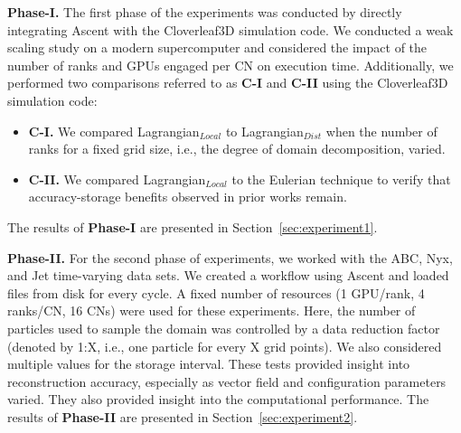 %
\textbf{Phase-I.} The first phase of the experiments was conducted by directly integrating Ascent with the Cloverleaf3D simulation code. 
%
We conducted a weak scaling study on a modern supercomputer and considered the impact of the number of ranks and GPUs engaged per CN on execution time. 
%
Additionally, we performed two comparisons referred to as \textbf{C-I} and \textbf{C-II} using the Cloverleaf3D simulation code: 
%
\begin{itemize}[leftmargin=*]
\item\textbf{C-I.} We compared Lagrangian$_{Local}$ to Lagrangian$_{Dist}$ when the number of ranks for a fixed grid size, i.e., the degree of domain decomposition, varied.
%
\item\textbf{C-II.} We compared Lagrangian$_{Local}$ to the Eulerian technique to verify that accuracy-storage benefits observed in prior works remain. 
\end{itemize}
%
The results of \textbf{Phase-I} are presented in Section~\ref{sec:experiment1}.

\textbf{Phase-II.} For the second phase of experiments, we worked with the ABC, Nyx, and Jet time-varying data sets.
%
We created a workflow using Ascent and loaded files from disk for every cycle.
%
A fixed number of resources (1 GPU/rank, 4 ranks/CN, 16 CNs) were used for these experiments.
%
Here, the number of particles used to sample the domain was controlled by a data reduction factor (denoted by 1:X, i.e., one particle for every X grid points). 
%
%
We also considered multiple values for the storage interval. 
%
These tests provided insight into reconstruction accuracy, especially as vector field and configuration parameters varied. 
%
They also provided insight into the computational performance.
%
The results of \textbf{Phase-II} are presented in Section~\ref{sec:experiment2}.

%


